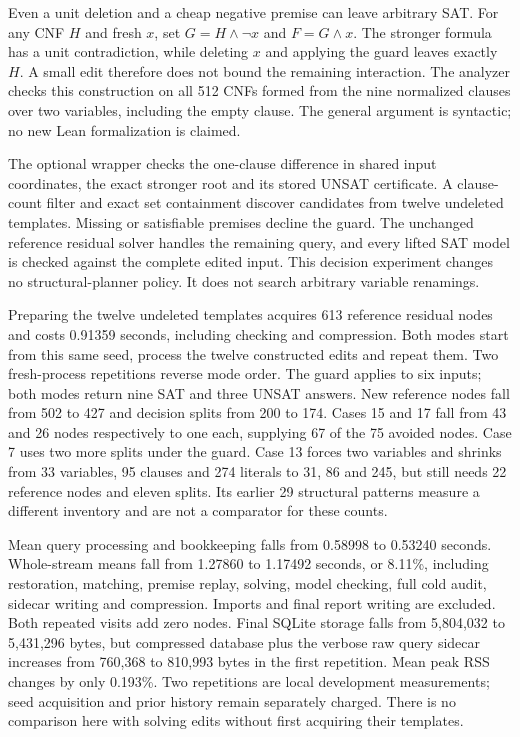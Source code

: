\documentclass[11pt,a4paper]{article}
\numberwithin{equation}{section}
\theoremstyle{plain}
\theoremstyle{definition}
\theoremstyle{remark}
\begin{document}
Even a unit deletion and a cheap negative premise can leave arbitrary SAT.
For any CNF $H$ and fresh $x$, set $G=H\land\neg x$ and $F=G\land x$.
The stronger formula has a unit contradiction, while deleting $x$ and applying
the guard leaves exactly $H$. A small edit therefore does not bound the
remaining interaction. The analyzer checks this construction on all 512 CNFs
formed from the nine normalized clauses over two variables, including the empty
clause. The general argument is syntactic; no new Lean formalization is claimed.

The optional wrapper checks the one-clause difference in shared input coordinates,
the exact stronger root and its stored UNSAT certificate. A clause-count filter
and exact set containment discover candidates from twelve undeleted templates.
Missing or satisfiable premises decline the guard. The unchanged reference
residual solver handles the remaining query, and every lifted SAT model is
checked against the complete edited input. This decision experiment changes no
structural-planner policy. It does not search arbitrary variable renamings.

Preparing the twelve undeleted templates acquires 613 reference residual nodes
and costs 0.91359 seconds, including checking and compression. Both modes start
from this same seed, process the twelve constructed edits and repeat them.
Two fresh-process repetitions reverse mode order. The guard applies to six
inputs; both modes return nine SAT and three UNSAT answers. New reference nodes
fall from 502 to 427 and decision splits from 200 to 174. Cases 15 and 17 fall
from 43 and 26 nodes respectively to one each, supplying 67 of the 75 avoided
nodes. Case 7 uses two more splits under the guard. Case 13 forces two variables
and shrinks from 33 variables, 95 clauses and 274 literals to 31, 86 and 245,
but still needs 22 reference nodes and eleven splits. Its earlier 29 structural
patterns measure a different inventory and are not a comparator for these counts.

Mean query processing and bookkeeping falls from 0.58998 to 0.53240 seconds.
Whole-stream means fall from 1.27860 to 1.17492 seconds, or 8.11\%, including
restoration, matching, premise replay, solving, model checking, full cold audit,
sidecar writing and compression. Imports and final report writing are excluded.
Both repeated visits add zero nodes. Final SQLite storage falls from 5,804,032
to 5,431,296 bytes, but compressed database plus the verbose raw query sidecar
increases from 760,368 to 810,993 bytes in the first repetition. Mean peak RSS
changes by only 0.193\%. Two repetitions are local development measurements;
seed acquisition and prior history remain separately charged. There is no
comparison here with solving edits without first acquiring their templates.
\end{document}
